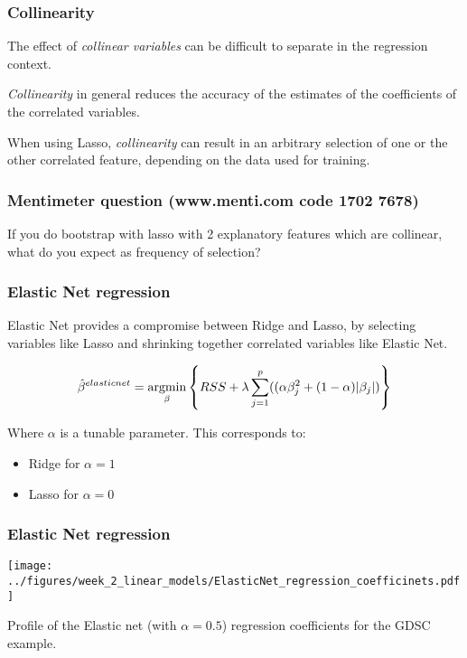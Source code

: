 \documentclass[notes]{beamer}          %
\newcommand{\argmin}{\operatornamewithlimits{argmin}}
\begin{document}
\begin{frame}
\frametitle{Collinearity}
The effect of \textit{collinear variables} can be difficult to separate in the regression context.

\vspace{5mm} 

\textit{Collinearity} in general reduces the accuracy of the estimates of the coefficients of the correlated variables.

\vspace{5mm} 

When using Lasso, \textit{collinearity} can result in an arbitrary selection of one or the other correlated feature, depending on the data used for training.
\end{frame}

\begin{frame}
\frametitle{Mentimeter question (www.menti.com code 1702 7678)}

If you do bootstrap with lasso with 2 explanatory features which are collinear, what do you expect as frequency of selection?

\end{frame}

\begin{frame}
\frametitle{Elastic Net regression}

Elastic Net provides a compromise between Ridge and Lasso, by selecting variables like Lasso and shrinking together correlated variables like Elastic Net.


\begin{equation*}
    \hat{\beta}^{elastic net} =  \argmin_{\beta} \left\{ RSS + \lambda \sum_{j=1}^p ((\alpha \beta_j^2 + (1-\alpha)| \beta_j |) \right\}
\end{equation*}

Where $\alpha$ is a tunable parameter. This corresponds to:

\begin{itemize}
    \item Ridge for $\alpha=1$
    \item Lasso for $\alpha=0$
\end{itemize}

\end{frame}

\begin{frame}
\frametitle{Elastic Net regression}

\begin{center}
\texttt{[image: ../figures/week\_2\_linear\_models/ElasticNet\_regression\_coefficinets.pdf]}
\end{center}

Profile of the Elastic net (with $\alpha=0.5$) regression coefficients for the GDSC example.

\end{frame}
\end{document}
